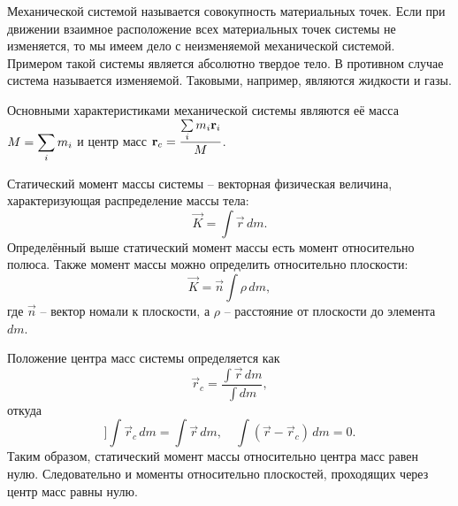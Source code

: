 
Механической системой называется совокупность материальных точек. Если при
движении взаимное расположение всех материальных точек системы не изменяется, то
мы имеем дело с неизменяемой механической системой. Примером такой системы
является абсолютно твердое тело. В противном случае система называется
изменяемой. Таковыми, например, являются жидкости и газы.

Основными характеристиками механической системы являются её масса
\( \displaystyle M = \sum_i m_i \) и центр масс \( \displaystyle \boldsymbol{\mathrm{r}}_c =
\frac{\sum\limits_i m_i\boldsymbol{\mathrm{r}}_i}{M} \).

Статический момент массы системы -- векторная физическая величина,
характеризующая распределение массы тела:
\[
    \vec{K} = \int \vec{r}\,dm.
\]
Определённый выше статический момент массы есть момент относительно полюса.
Также момент массы можно определить относительно плоскости:
\[
    \vec{K} = \vec{n}\int \rho\,dm,
\]
где \( \vec{n} \) -- вектор номали к плоскости, а \( \rho \) -- расстояние
от плоскости до элемента \( dm \).

Положение центра масс системы определяется как
\[
    \vec{r}_c = \frac{\int \vec{r}\,dm}{\int dm},
\]
откуда
\[]
    \int\vec{r}_c\,dm = \int \vec{r}\,dm,\quad
    \int(\vec{r} - \vec{r}_c)\,dm = 0.
\]
Таким образом, статический момент массы относительно центра масс равен нулю.
Следовательно и моменты относительно плоскостей, проходящих через центр масс
равны нулю.

\newpage %
